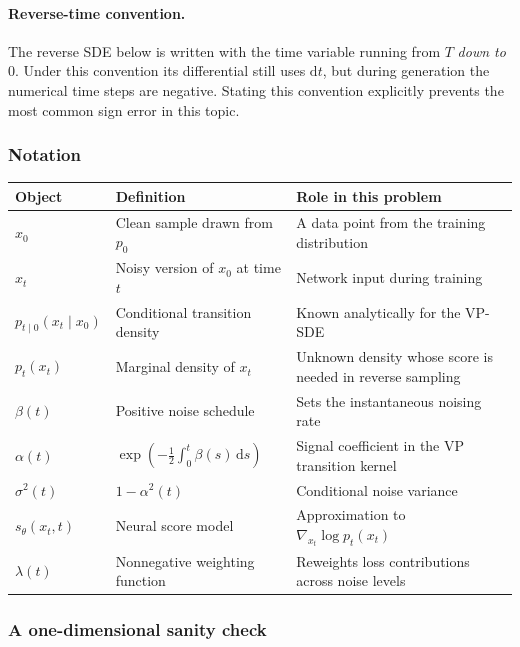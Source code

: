 \documentclass[11pt,a4paper]{article}
\theoremstyle{definition}
\begin{document}
\paragraph{Reverse-time convention.}
The reverse SDE below is written with the time variable running from $T$ \emph{down to} $0$. Under this convention its differential still uses $\mathrm{d}t$, but during generation the numerical time steps are negative. Stating this convention explicitly prevents the most common sign error in this topic.

\subsubsection{Notation}

{\footnotesize
\setlength{\tabcolsep}{3pt}
\renewcommand{\arraystretch}{1.2}
\noindent
\begin{tabularx}{\linewidth}{|
  >{\raggedright\arraybackslash}p{2.65cm}|
  >{\raggedright\arraybackslash}X|
  >{\raggedright\arraybackslash}X|
}
\hline
\textbf{Object} & \textbf{Definition} & \textbf{Role in this problem} \\
\hline
$x_0$ & Clean sample drawn from $p_0$ & A data point from the training distribution \\
\hline
$x_t$ & Noisy version of $x_0$ at time $t$ & Network input during training \\
\hline
$p_{t\mid 0}(x_t\mid x_0)$ & Conditional transition density & Known analytically for the VP-SDE \\
\hline
$p_t(x_t)$ & Marginal density of $x_t$ & Unknown density whose score is needed in reverse sampling \\
\hline
$\beta(t)$ & Positive noise schedule & Sets the instantaneous noising rate \\
\hline
$\alpha(t)$ & $\exp\!\left(-\frac12\int_0^t\beta(s)\,\mathrm{d}s\right)$ & Signal coefficient in the VP transition kernel \\
\hline
$\sigma^2(t)$ & $1-\alpha^2(t)$ & Conditional noise variance \\
\hline
$s_\theta(x_t,t)$ & Neural score model & Approximation to $\nabla_{x_t}\log p_t(x_t)$ \\
\hline
$\lambda(t)$ & Nonnegative weighting function & Reweights loss contributions across noise levels \\
\hline
\end{tabularx}
\par}

\subsubsection{A one-dimensional sanity check}
\end{document}
